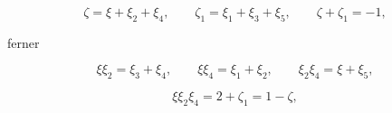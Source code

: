 \[
\zeta = \xi + \xi_2 + \xi_4, \qquad \zeta_1 = \xi_1 + \xi_3 + \xi_5, \qquad \zeta + \zeta_1 = -1,
\]

ferner

\[
\xi\xi_2 = \xi_3 + \xi_4, \qquad \xi\xi_4 = \xi_1 + \xi_2, \qquad \xi_2\xi_4 = \xi + \xi_5,
\]

\[
\xi\xi_2\xi_4 = 2 + \zeta_1 = 1 - \zeta,
\]

